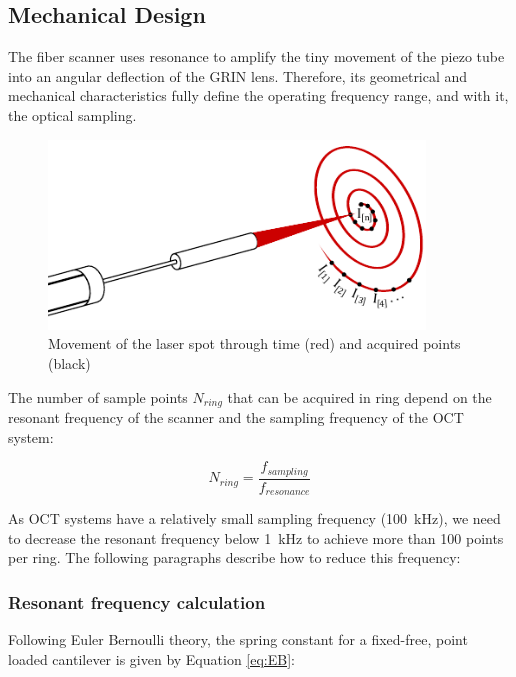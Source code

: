 \newpage
\subsection{Mechanical Design}

The fiber scanner uses resonance to amplify the tiny movement of the piezo tube into an angular deflection of the GRIN lens. Therefore, its geometrical and mechanical characteristics fully define the operating frequency range, and with it, the optical sampling.

\begin{figure}[h!]\centering
      \includegraphics[width=10cm]{figures/30_DesignSimulation/Mechanical/spiralScanning.pdf}
      \caption{Movement of the laser spot through time (red) and acquired points (black)}
      \label{fig:spiralScanning}
\end{figure}

The number of sample points $N_{ring}$ that can be acquired in ring depend on the resonant frequency of the scanner and the sampling frequency of the OCT system:

\begin{equation}
N_{ring} = \frac{f_{sampling}}{f_{resonance}}
\label{eq:nring}
\end{equation}

As OCT systems have a relatively small sampling frequency (\SI{100}{\kilo\hertz}), we need to decrease the resonant frequency below \SI{1}{kHz} to achieve more than 100 points per ring. The following paragraphs describe how to reduce this frequency:

\subsubsection{Resonant frequency calculation}
Following Euler Bernoulli theory, the spring constant for a fixed-free, point loaded cantilever is given by Equation \ref{eq:EB}: 

